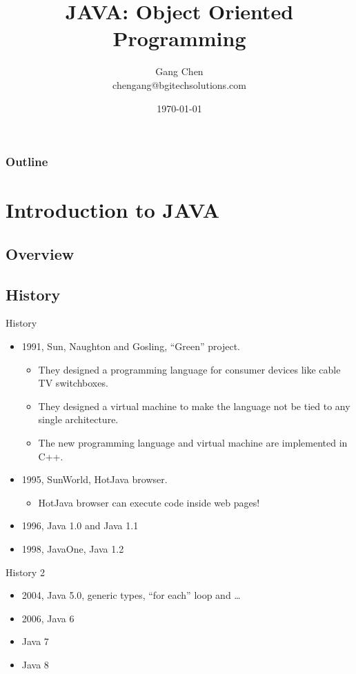 \documentclass[UTF8]{beamer}
\title{JAVA: Object Oriented Programming}
\author{Gang Chen\\ chengang@bgitechsolutions.com}
\date{\today}
\begin{document}
\begin{frame}
\titlepage
\end{frame}
\begin{frame}[t]\frametitle{Outline}
\tableofcontents[hideallsubsections]
\end{frame}

\section{Introduction to JAVA}

\subsection{Overview}


\subsection{History}
\begin{frame}[t]{History}
  \begin{itemize}
    \item 1991, Sun, Naughton and Gosling, ``Green'' project.\\
    \begin{itemize}
      \item They designed a programming language for consumer devices like cable TV
      switchboxes.
      \item They designed a virtual machine to make the language not be tied to any
      single architecture.
      \item The new programming language and virtual machine are implemented in C++.
    \end{itemize}

    \item 1995, SunWorld, HotJava browser.\\
    \begin{itemize}
      \item HotJava browser can execute code inside web pages!
    \end{itemize}

    \item 1996, Java 1.0 and Java 1.1
    \item 1998, JavaOne, Java 1.2
  \end{itemize}
\end{frame}

\begin{frame}[t]{History 2}
  \begin{itemize}
    \item 2004, Java 5.0, generic types, ``for each'' loop and \ldots
    \item 2006, Java 6
    \item Java 7
    \item Java 8
  \end{itemize}
\end{frame}
\end{document}
